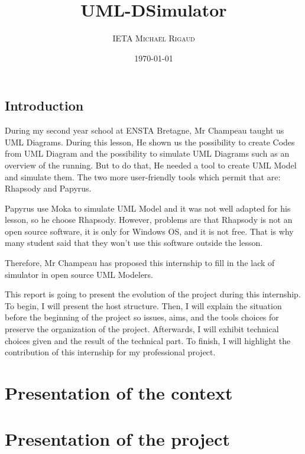 \documentclass[a4paper, 11pt, oneside, oldfontcommands]{memoir}
\title{UML-DSimulator}
\author{\textsc{IETA Michaël Rigaud }}
\date{\today}
\newcounter{th}[chapter]
\begin{document}
\maketitle
\thispagestyle{empty}
\newpage




\tableofcontents



\chapter*{Introduction}

During my second year school at ENSTA Bretagne, Mr Champeau taught us UML Diagrams. During this lesson, He shown us the possibility to create Codes from UML Diagram and the possibility to simulate UML Diagrams such as an overview of the running. But to do that, He needed a tool to create UML Model and simulate them. The two more user-friendly tools which permit that are: Rhapsody and Papyrus.

Papyrus use Moka to simulate UML Model and it was not well adapted for his lesson, so he choose Rhapsody. However, problems are that Rhapsody is not an open source software, it is only for Windows OS, and it is not free. That is why many student said that they won't use this software outside the lesson.

Therefore, Mr Champeau has proposed this internship to fill in the lack of simulator in open source UML Modelers.

This report is going to present the evolution of the project during this internship. To begin, I will present the host structure. Then, I will explain the situation before the beginning of the project so issues, aims, and the tools choices for preserve the organization of the project. Afterwards, I will exhibit technical choices given and the result of the technical part. To finish, I will highlight the contribution of this internship for my professional project.

\newpage

\part{Presentation of the context}




\part{Presentation of the project}
\end{document}
